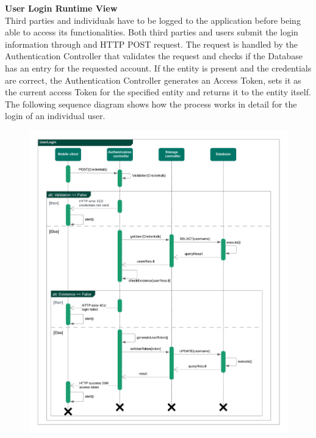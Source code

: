\begin{legal}
\begin{legal}
				\newpage
				\item \textbf{User Login Runtime View}\\
Third parties and individuals have to be logged to the application before being able to access its functionalities.
Both third parties and users submit the login information through and HTTP POST request.
The request is handled by the Authentication Controller that validates the request and checks if the Database has an entry for the requested account. If the entity is present and the credentials are correct, the Authentication Controller generates an Access Token, sets it as the current access Token for the specified entity and returns it to the entity itself.
The following sequence diagram shows how the process works in detail for the login of an individual user.\\
				\begin{figure}[H]
				\includegraphics[width=\linewidth]{images/seq_diagrams/userLoginSeq.png}\\
				\end{figure}
				

\end{legal}
\end{legal}
